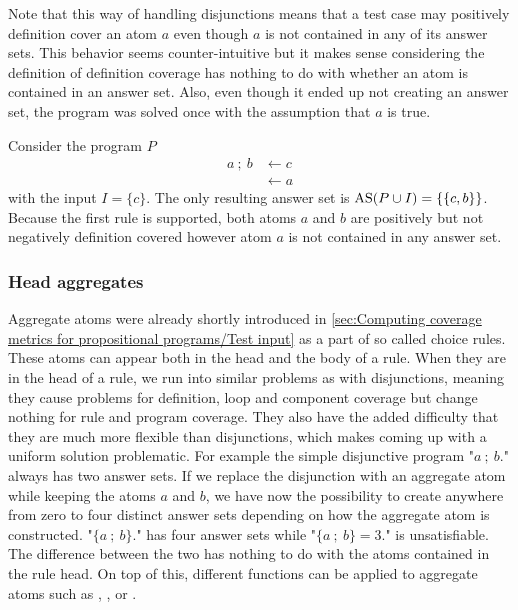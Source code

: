 Note that this way of handling disjunctions means that a test case may positively definition cover an atom $a$ even though $a$ is not contained in any of its answer sets. This behavior seems counter-intuitive but it makes sense considering the definition of definition coverage has nothing to do with whether an atom is contained in an answer set. Also, even though it ended up not creating an answer set, the program was solved once with the assumption that $a$ is true.

\begin{example}
    Consider the program $P$
    \begin{align*}
        a\ ;\ b &\leftarrow c \\
        &\leftarrow a
    \end{align*}
    with the input \(I = \{c\}\). The only resulting answer set is \(\operatorname{AS}(P \cup I) = \{\{c, b\}\}\). Because the first rule is supported, both atoms $a$ and $b$ are positively but not negatively definition covered however atom $a$ is not contained in any answer set.
\end{example}


\subsubsection{Head aggregates}
\label{subsubsec:Coverage for further program classes/Language constructs/Head aggregates}
Aggregate atoms were already shortly introduced in \cref{sec:Computing coverage metrics for propositional programs/Test input} as a part of so called choice rules. These atoms can appear both in the head and the body of a rule. When they are in the head of a rule, we run into similar problems as with disjunctions, meaning they cause problems for definition, loop and component coverage but change nothing for rule and program coverage. They also have the added difficulty that they are much more flexible than disjunctions, which makes coming up with a uniform solution problematic. For example the simple disjunctive program "\(a\ ;\ b.\)" always has two answer sets. If we replace the disjunction with an aggregate atom while keeping the atoms $a$ and $b$, we have now the possibility to create anywhere from zero to four distinct answer sets depending on how the aggregate atom is constructed. "\(\{a\ ;\ b\}.\)" has four answer sets while "\(\{a\ ;\ b\} = 3.\)" is unsatisfiable. The difference between the two has nothing to do with the atoms contained in the rule head. On top of this, different functions can be applied to aggregate atoms such as , ,  or .

